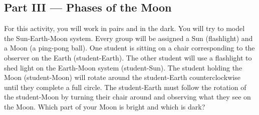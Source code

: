 \documentclass[10pt]{article}
\begin{document}
\begin{flushleft}










\vspace{0.3in}

\section*{Part III --- Phases of the Moon}
For this activity, you will work in pairs and in the dark. You will try to model the Sun-Earth-Moon system. Every group will be assigned a Sun (flashlight) and a Moon (a ping-pong ball). One student is sitting on a chair corresponding to the observer on the Earth (student-Earth). The other student will use a flashlight to shed light on the Earth-Moon system (student-Sun). The student holding the Moon (student-Moon) will rotate around the student-Earth counterclockwise until they complete a full circle. The student-Earth must follow the rotation of the student-Moon by turning their chair around and observing what they see on the Moon. Which part of your Moon is bright and which is
dark?


\end{flushleft}
\end{document}
